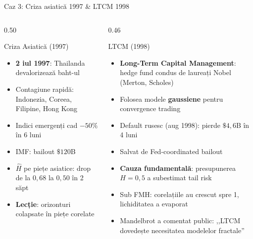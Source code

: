 \documentclass[9pt, aspectratio=169, t]{beamer}
\theoremstyle{definition}
\newenvironment{cminipage}[1]{%
    \par\noindent\hfill\begin{minipage}{#1}\ignorespaces
}{%
    \end{minipage}\hfill\null\par
}
\begin{document}
\begin{frame}[shrink=15]{Caz 3: Criza asiatică 1997 \& LTCM 1998}
\begin{cminipage}{0.95\textwidth}
\begin{columns}[T]
\begin{column}{0.50\textwidth}
\begin{exampleblock}{Criza Asiatică (1997)}
\begin{itemize}\setlength{\itemsep}{0pt}
    \item \textbf{2 iul 1997}: Thailanda devalorizează baht-ul
    \item Contagiune rapidă: Indonezia, Coreea, Filipine, Hong Kong
    \item Indici emergenți cad $-50\%$ în 6 luni
    \item IMF: bailout $\$120$B
    \item $\hat{H}$ pe piețe asiatice: drop de la $0{,}68$ la $0{,}50$ în 2 săpt
    \item \textbf{Lecție}: orizonturi colapsate în piețe corelate
\end{itemize}
\end{exampleblock}
\end{column}
\begin{column}{0.46\textwidth}
\begin{alertblock}{LTCM (1998)}
\begin{itemize}\setlength{\itemsep}{0pt}
    \item \textbf{Long-Term Capital Management}: hedge fund condus de laureați Nobel (Merton, Scholes)
    \item Folosea modele \textbf{gaussiene} pentru convergence trading
    \item Default rusesc (aug 1998): pierde $\$4{,}6$B în 4 luni
    \item Salvat de Fed-coordinated bailout
    \item \textbf{Cauza fundamentală}: presupunerea $H = 0{,}5$ a subestimat tail risk
    \item Sub FMH: corelațiile au crescut spre 1, lichiditatea a evaporat
    \item Mandelbrot a comentat public: ,,LTCM dovedește necesitatea modelelor fractale''
\end{itemize}
\end{alertblock}
\end{column}
\end{columns}
\end{cminipage}
\end{frame}
\end{document}
